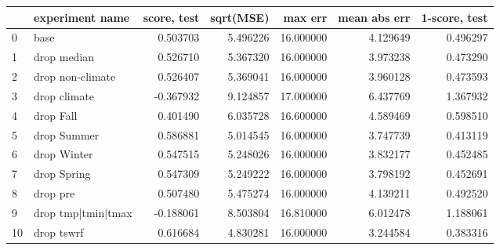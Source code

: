 \begin{tabular}{llrrrrr}
\toprule
 & experiment name & score, test & sqrt(MSE) & max err & mean abs err & 1-score, test \\
\midrule
0 & base & 0.503703 & 5.496226 & 16.000000 & 4.129649 & 0.496297 \\
1 & drop median & 0.526710 & 5.367320 & 16.000000 & 3.973238 & 0.473290 \\
2 & drop non-climate & 0.526407 & 5.369041 & 16.000000 & 3.960128 & 0.473593 \\
3 & drop climate & -0.367932 & 9.124857 & 17.000000 & 6.437769 & 1.367932 \\
4 & drop Fall & 0.401490 & 6.035728 & 16.600000 & 4.589469 & 0.598510 \\
5 & drop Summer & 0.586881 & 5.014545 & 16.000000 & 3.747739 & 0.413119 \\
6 & drop Winter & 0.547515 & 5.248026 & 16.000000 & 3.832177 & 0.452485 \\
7 & drop Spring & 0.547309 & 5.249222 & 16.000000 & 3.798192 & 0.452691 \\
8 & drop pre & 0.507480 & 5.475274 & 16.000000 & 4.139211 & 0.492520 \\
9 & drop tmp|tmin|tmax & -0.188061 & 8.503804 & 16.810000 & 6.012478 & 1.188061 \\
10 & drop tswrf & 0.616684 & 4.830281 & 16.000000 & 3.244584 & 0.383316 \\
\bottomrule
\end{tabular}
